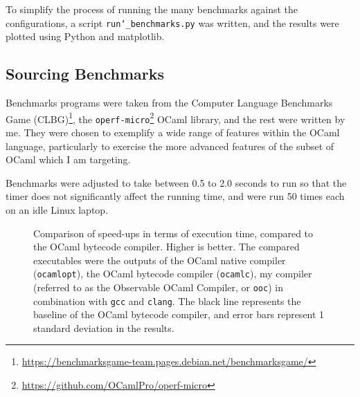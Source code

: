 To simplify the process of running the many benchmarks against the
configurations, a script \texttt{run\char`_benchmarks.py} was written, and the
results were plotted using Python and matplotlib.

\subsection{Sourcing Benchmarks}

Benchmarks programs were taken from the Computer Language Benchmarks Game
(CLBG)\footnote{\url{https://benchmarksgame-team.pages.debian.net/benchmarksgame/}},
the \texttt{operf-micro}\footnote{\url{https://github.com/OCamlPro/operf-micro}}
OCaml library, and the rest were written by me.  They were chosen to exemplify a
wide range of features within the OCaml language, particularly to exercise the
more advanced features of the subset of OCaml which I am targeting.

Benchmarks were adjusted to take between 0.5 to 2.0 seconds to run so that the
timer does not significantly affect the running time, and were run 50 times each
on an idle Linux laptop.

\begin{figure}
    \centering

    \caption{
    Comparison of speed-ups in terms of execution time, compared to the OCaml
    bytecode compiler. Higher is better. The compared executables were the
    outputs of the OCaml native compiler (\texttt{ocamlopt}), the OCaml bytecode
    compiler (\texttt{ocamlc}), my compiler (referred to as the Observable OCaml
    Compiler, or \texttt{ooc}) in combination with \texttt{gcc} and
    \texttt{clang}. The black line represents the baseline of the OCaml bytecode
    compiler, and error bars represent 1 standard deviation in the results.
    }
    
    \label{fig:raw-benchmarks}
\end{figure}


